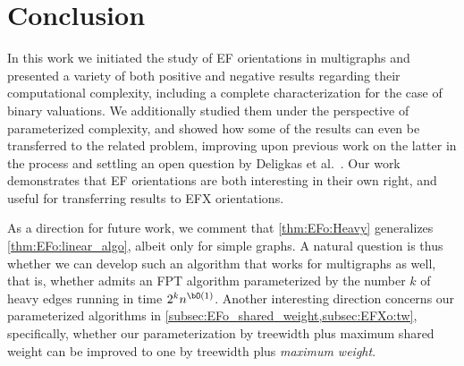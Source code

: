 \documentclass[11pt,letterpaper]{article}
\begin{document}

%


\section{Conclusion}\label{sec:conclusion}

In this work we initiated the study of EF orientations in multigraphs and presented a variety of both positive and negative results regarding
their computational complexity, including a complete characterization for the case of binary valuations. We additionally studied them under the perspective of parameterized complexity,
and showed how some of the results can even be transferred to the related {\EFXo} problem, improving upon previous work on the latter in the process and settling an open question by Deligkas et al.~\cite{ijcai/DeligkasEGK25}. Our work demonstrates that EF orientations are both interesting in their own right, and useful for transferring results to EFX orientations.

As a direction for future work, we comment that \cref{thm:EFo:Heavy} generalizes \cref{thm:EFo:linear_algo}, albeit only for simple graphs.
A natural question is thus whether we can develop such an algorithm that works for multigraphs as well, that is, whether {\EFo}
admits an FPT algorithm parameterized by the number $k$ of heavy edges running in time $2^k n^{\bO(1)}$.
Another interesting direction concerns our parameterized algorithms in \cref{subsec:EFo_shared_weight,subsec:EFXo:tw}, specifically, whether our parameterization by treewidth plus maximum shared weight can be improved to one by treewidth plus \emph{maximum weight}.
\end{document}
